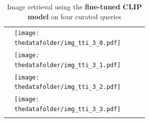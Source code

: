\documentclass[10pt]{article} %
\newcommand{\SM}[1]{\textcolor{blue}{[SM: #1]}}
\begin{document}
\begin{table}[h!]
\begin{tabular}{m{3cm} p{3cm} p{3cm} p{3cm} p{3cm}}
      \midrule
      \texttt{} \vspace{20mm} & \centering \texttt{[image: \\thedatafolder/img\_tti\_3\_0.pdf]} \\  & \centering \texttt{[image: \\thedatafolder/img\_tti\_3\_1.pdf]} \\  & \centering \texttt{[image: \\thedatafolder/img\_tti\_3\_2.pdf]} \\  & \centering \texttt{[image: \\thedatafolder/img\_tti\_3\_3.pdf]} \\   \tabularnewline
      \bottomrule
  \end{tabular}
  \caption{Image retrieval using the \textbf{\textcolor{deepred}{fine-tuned CLIP model}} on four curated queries}
  \label{tab:tti}
\end{table}


\end{document}
